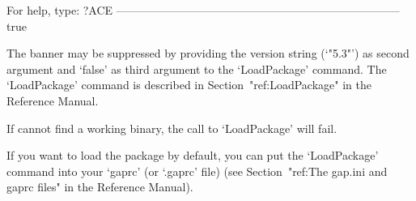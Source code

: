                  For help, type: ?ACE
---------------------------------------------------------------------------
true

\endexample

The banner may be suppressed by providing the version string (`"5.3"')
as second argument and `false' as third argument to the  `LoadPackage'
command.    The    `LoadPackage'    command    is     described     in
Section~"ref:LoadPackage" in the {\GAP} Reference Manual.

If {\GAP} cannot find a working binary, the call to `LoadPackage' will
fail.

If you want to load  the  {\ACE}  package  by   default,  you  can  put
the  `LoadPackage' command into your `gaprc' (or  `.gaprc'  file)  (see
Section~"ref:The gap.ini and gaprc files" in the {\GAP} Reference Manual).

